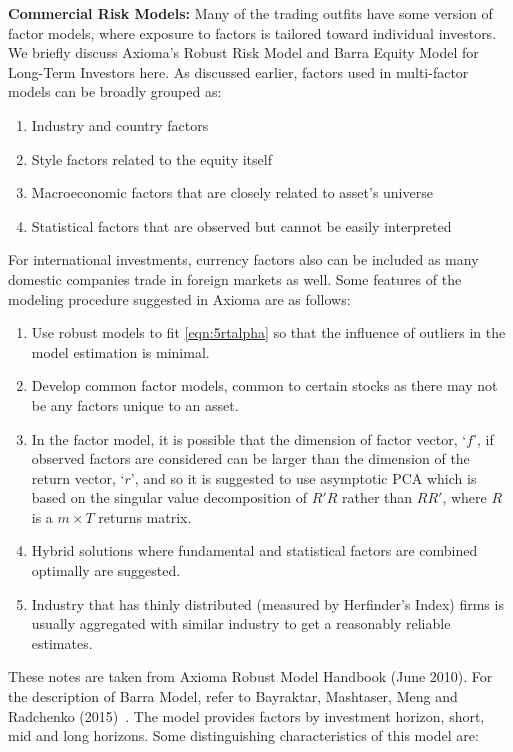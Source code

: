 \noindent\textbf{Commercial Risk Models:} Many of the trading outfits have some version of factor models, where exposure to factors is tailored toward individual investors. We briefly discuss Axioma's Robust Risk Model and Barra Equity Model for Long-Term Investors here. As discussed earlier, factors used in multi-factor models can be broadly grouped as:


\begin{enumerate}[--]
\item Industry and country factors
\item Style factors related to the equity itself
\item Macroeconomic factors that are closely related to asset's universe
\item Statistical factors that are observed but cannot be easily interpreted
\end{enumerate}


For international investments, currency factors also can be included as many domestic companies trade in foreign markets as well. Some features of the modeling procedure suggested in Axioma are as follows:


\begin{enumerate}[--]
\item Use robust models to fit \eqref{eqn:5rtalpha} so that the influence of outliers in the model estimation is minimal.
\item Develop common factor models, common to certain stocks as there may not be any factors unique to an asset.
\item In the factor model, it is possible that the dimension of factor vector, `$f$', if observed factors are considered can be larger than the dimension of the return vector, `$r$', and so it is suggested to use asymptotic PCA which is based on the singular value decomposition of $R'R$ rather than $RR'$, where $R$ is a $m \times T$ returns matrix.
\item Hybrid solutions where fundamental and statistical factors are combined optimally are suggested. 
\item Industry that has thinly distributed (measured by Herfinder's Index) firms is usually aggregated with similar industry to get a reasonably reliable estimates.
\end{enumerate}


These notes are taken from Axioma Robust Model Handbook (June 2010). For the description of Barra Model, refer to Bayraktar, Mashtaser, Meng and Radchenko (2015)~\cite{baymasmenrad15}. The model provides factors by investment horizon, short, mid and long horizons. Some distinguishing characteristics of this model are:


